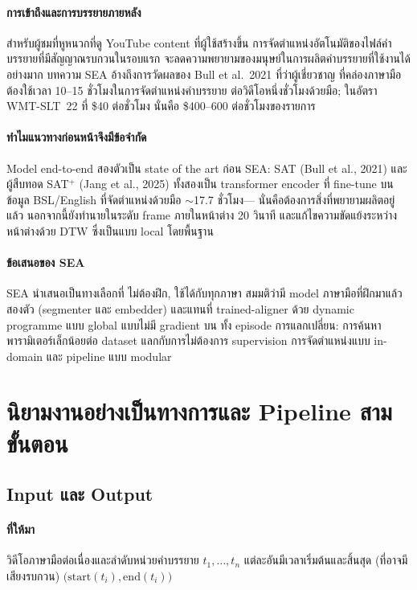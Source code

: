 \documentclass[11pt,a4paper]{article}
\def\emph#1{#1}%
\begin{document}
\paragraph{การเข้าถึงและการบรรยายภายหลัง}
สำหรับผู้ชมที่หูหนวกที่ดู YouTube content ที่ผู้ใช้สร้างขึ้น
การจัดตำแหน่งอัตโนมัติของไฟล์คำบรรยายที่มีสัญญาณรบกวนในรอบแรก
จะลดความพยายามของมนุษย์ในการผลิตคำบรรยายที่ใช้งานได้อย่างมาก
บทความ SEA อ้างถึงการวัดผลของ Bull et al.\ 2021 ที่ว่าผู้เชี่ยวชาญ
ที่คล่องภาษามือต้องใช้เวลา 10--15 ชั่วโมงในการจัดตำแหน่งคำบรรยาย
ต่อวิดีโอหนึ่งชั่วโมงด้วยมือ; ในอัตรา WMT-SLT~22 ที่ \$40 ต่อชั่วโมง
นั่นคือ \$400--600 ต่อชั่วโมงของรายการ

\paragraph{ทำไมแนวทางก่อนหน้าจึงมีข้อจำกัด}
Model end-to-end สองตัวเป็น state of the art ก่อน SEA: \emph{SAT}
(Bull et al., 2021) และผู้สืบทอด \emph{SAT$^{+}$} (Jang et al., 2025)
ทั้งสองเป็น transformer encoder ที่ fine-tune บนข้อมูล BSL/English
ที่จัดตำแหน่งด้วยมือ $\sim$17.7 ชั่วโมง--- นั่นคือต้องการสิ่งที่พยายามผลิตอยู่แล้ว
นอกจากนี้ยังทำนายในระดับ frame ภายในหน้าต่าง 20 วินาที
และแก้ไขความขัดแย้งระหว่างหน้าต่างด้วย DTW ซึ่งเป็นแบบ local โดยพื้นฐาน

\paragraph{ข้อเสนอของ SEA}
SEA นำเสนอเป็นทางเลือกที่ \emph{ไม่ต้องฝึก, ใช้ได้กับทุกภาษา}
สมมติว่ามี model ภาษามือที่ฝึกมาแล้วสองตัว (segmenter และ embedder)
และแทนที่ trained-aligner ด้วย dynamic programme แบบ global แบบไม่มี gradient
บน \emph{ทั้ง episode} การแลกเปลี่ยน: การค้นหาพารามิเตอร์เล็กน้อยต่อ dataset
แลกกับการไม่ต้องการ supervision การจัดตำแหน่งแบบ in-domain และ pipeline แบบ modular


\section{นิยามงานอย่างเป็นทางการและ Pipeline สามขั้นตอน}
\label{sec:formal-task}

\subsection{Input และ Output}
\paragraph{ที่ให้มา}
วิดีโอภาษามือต่อเนื่องและลำดับหน่วยคำบรรยาย $t_1, \ldots, t_n$
แต่ละอันมีเวลาเริ่มต้นและสิ้นสุด (ที่อาจมีเสียงรบกวน)
$\bigl(\mathrm{start}(t_i), \mathrm{end}(t_i)\bigr)$
\end{document}
